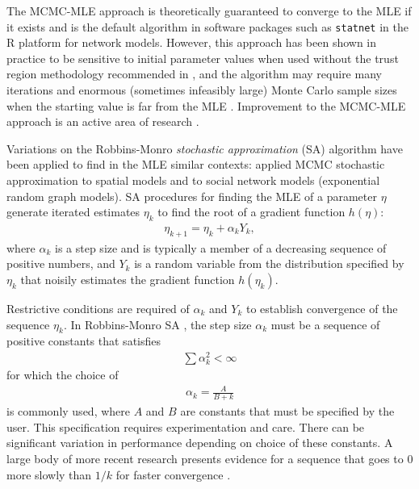 \documentclass[oneside]{myumnStatThesis}
\begin{document}
The MCMC-MLE approach is theoretically guaranteed to converge to the MLE if it exists and is the default algorithm in 
software packages such as \texttt{statnet} \citep{statnet:R} in the R platform for network models.  
However, this approach has been shown in practice to be sensitive to initial parameter values when used without the 
trust region methodology recommended in \citep{Geyer:1992}, and the algorithm may require many iterations and enormous 
(sometimes infeasibly large) Monte Carlo sample sizes when the starting value is far from the MLE \citep*{ergm}.  
Improvement to the MCMC-MLE approach is an active area of research \citep{Hummel}.     

Variations on the Robbins-Monro \emph{stochastic approximation} (SA) algorithm \citep{Robbins-Monro} have 
been applied to find in the MLE similar contexts: \citet{Younes:1988,Younes:1989,Moyeed:1991,Gu:2001}
applied MCMC stochastic approximation to spatial models and \citet{Snijders:2002} to social network 
models (exponential random graph models).
SA procedures for finding the MLE of a parameter $\eta$ generate iterated estimates $\eta_k$ to find the 
root of a gradient function $h(\eta)$:
\begin{align} \label{E:eta SA update}
	\eta_{k+1} = \eta_k + \alpha_k Y_k,
\end{align}
where $\alpha_k$ is a step size and is typically a member of a decreasing sequence of positive numbers, and $Y_k$ is a 
random variable from the distribution specified by $\eta_k$ that noisily estimates the gradient function $h(\eta_k)$.  

Restrictive conditions are required of $\alpha_k$ and $Y_k$ to establish convergence of the sequence $\eta_k$.  
In Robbins-Monro SA \citep{Robbins-Monro}, the step size $\alpha_k$ must be a sequence of positive constants 
that satisfies 
\begin{align*}
\sum \alpha_k^2 < \infty
\end{align*}
for which the choice of
\begin{align} \label{E:SA step size}
\alpha_k = \frac{A}{B + k}
\end{align}
 is commonly used, where $A$ and $B$ are constants that must be specified by the user.  This specification requires experimentation and care.  There can be significant variation in performance depending on choice of these constants. 
A large body of more recent research presents evidence for a sequence that goes to 0 more slowly than $1/k$ 
for faster convergence \citep[Chapter 11]{Kushner:1997}.  
\end{document}
